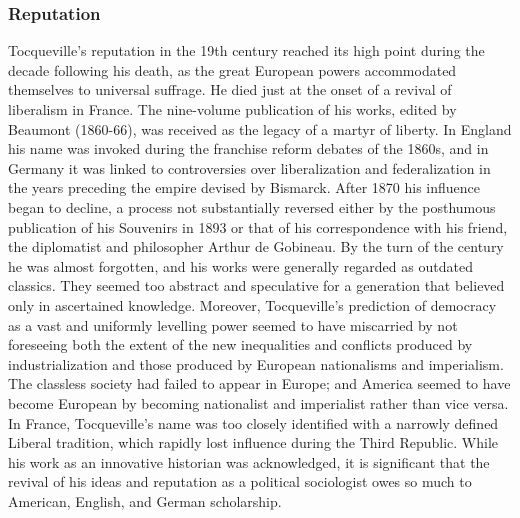 \documentclass[12pt]{article}
\begin{document}
\subsubsection{Reputation}
Tocqueville's reputation in the 19th century reached its high point
                                      during the decade following his death, as the great European powers
                                      accommodated themselves to universal suffrage. He died just at the
                                      onset of a revival of liberalism in France. The nine-volume
                                      publication of his works, edited by Beaumont (1860-66), was received
                                      as the legacy of a martyr of liberty. In England his name was invoked
                                      during the franchise reform debates of the 1860s, and in Germany it
                                      was linked to controversies over liberalization and federalization in
                                      the years preceding the empire devised by Bismarck. After 1870 his
                                      influence began to decline, a process not substantially reversed
                                      either by the posthumous publication of his Souvenirs in 1893 or
                                      that of his correspondence with his friend, the diplomatist and
                                      philosopher Arthur de Gobineau. By the turn of the century he was
                                      almost forgotten, and his works were generally regarded as outdated
                                      classics. They seemed too abstract and speculative for a generation
                                      that believed only in ascertained knowledge. Moreover, Tocqueville's
                                      prediction of democracy as a vast and uniformly levelling power
                                      seemed to have miscarried by not foreseeing both the extent of the
                                      new inequalities and conflicts produced by industrialization and those
                                      produced by European nationalisms and imperialism. The classless
                                      society had failed to appear in Europe; and America seemed to have
                                      become European by becoming nationalist and imperialist rather than
                                      vice versa. In France, Tocqueville's name was too closely identified
                                      with a narrowly defined Liberal tradition, which rapidly lost
                                      influence during the Third Republic. While his work as an innovative
                                      historian was acknowledged, it is significant that the revival of his
                                      ideas and reputation as a political sociologist owes so much to
                                      American, English, and German scholarship. 
\end{document}
